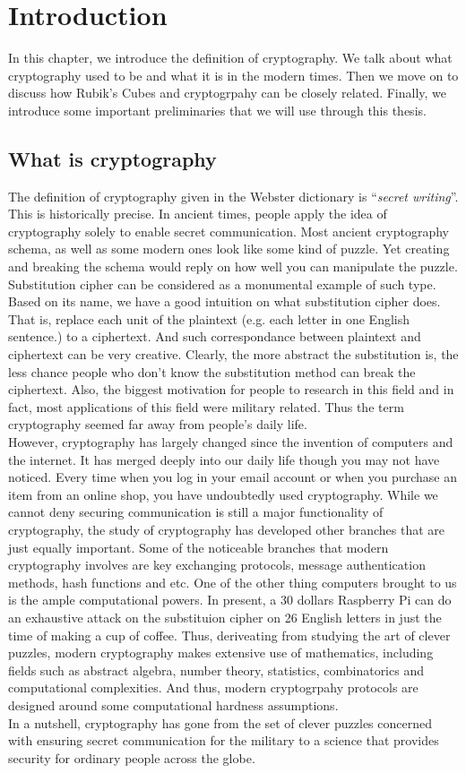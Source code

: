 \doublespacing
\chapter{Introduction}
In this chapter, we introduce the definition of cryptography. We talk about what cryptography used to be and what it is in the modern times. Then we move on to discuss how Rubik's Cubes and cryptogrpahy can be closely related. Finally, we introduce some important preliminaries that we will use through this thesis.

\section{What is cryptography}
The definition of cryptography given in the Webster dictionary is ``\textit{secret writing}''. This is historically precise. In ancient times, people apply the idea of cryptography solely to enable secret communication. Most ancient cryptography schema, as well as some modern ones look like some kind of puzzle. Yet creating and breaking the schema would reply on how well you can manipulate the puzzle. Substitution cipher can be considered as a monumental example of such type. Based on its name, we have a good intuition on what substitution cipher does. That is, replace each unit of the plaintext (e.g. each letter in one English sentence.) to a ciphertext. And such correspondance between plaintext and ciphertext can be very creative. Clearly, the more abstract the substitution is, the less chance people who don't know the substitution method can break the ciphertext. Also, the biggest motivation for people to research in this field and in fact, most applications of this field were military related. Thus the term cryptography seemed far away from people's daily life. \\
However, cryptography has largely changed since the invention of computers and the internet. It has merged deeply into our daily life though you may not have noticed. Every time when you log in your email account or when you purchase an item from an online shop, you have undoubtedly used cryptography. While we cannot deny securing communication is still a major functionality of cryptography, the study of cryptography has developed other branches that are just equally important. Some of the noticeable branches that modern cryptography involves are key exchanging protocols, message authentication methods, hash functions and etc. One of the other thing computers brought to us is the ample computational powers. In present, a 30 dollars Raspberry Pi can do an exhaustive attack on the substituion cipher on 26 English letters in just the time of making a cup of coffee. Thus, deriveating from studying the art of clever puzzles, modern cryptography makes extensive use of mathematics, including fields such as abstract algebra, number theory, statistics, combinatorics and computational complexities. And thus, modern cryptogrpahy protocols are designed around some computational hardness assumptions. \\
In a nutshell, cryptography has gone from the set of clever puzzles concerned with ensuring secret communication for the military to a science that provides security for ordinary people across the globe.


